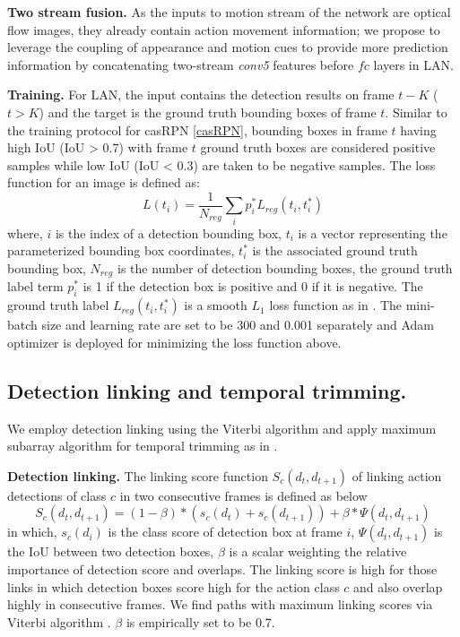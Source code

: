 \documentclass{bmvc2k}
\begin{document}
\textbf{Two stream fusion.}
As the inputs to motion stream of the network are optical flow images, they already contain action movement information; we propose to leverage the coupling of appearance and motion cues to provide more prediction information by concatenating two-stream \textit{conv5} features before $fc$ layers in LAN.

\textbf{Training.} For LAN, the input contains the detection results on frame $t-K$ ($t>K$) and the target is the ground truth bounding boxes of frame $t$. Similar to the training protocol for casRPN \ref{casRPN}, bounding boxes in frame $t$ having high IoU (IoU > 0.7) with frame $t$ ground truth boxes are considered positive samples while low IoU (IoU < 0.3) are taken to be negative samples. The loss function for an image is defined as: \begin{equation}
L(t_i) = \frac{1}{N_{reg}}\sum_ip_i^*L_{reg}(t_i, t_i^*) 
\end{equation}
where, $i$ is the index of a detection bounding box, $t_i$ is a vector representing the parameterized bounding box coordinates, $t_i^*$ is the associated ground truth bounding box, $N_{reg}$ is the number of detection bounding boxes, the ground truth label term $p_i^*$ is 1 if the detection box is positive and 0 if it is negative. The ground truth label $L_{reg}(t_i, t_i^*)$ is a smooth $L_1$ loss function as in \cite{schmidt2007fast}. The mini-batch size and learning rate are set to be 300 and 0.001 separately and Adam optimizer \cite{kingma2014adam} is deployed for minimizing the loss function above.

\subsection{Detection linking and temporal trimming.} 

We employ detection linking using the Viterbi algorithm \cite{forney1973viterbi} and apply maximum subarray algorithm for temporal trimming as in \cite{peng2016multi}.

\textbf{Detection linking.} The linking score function $S_c(d_t, d_{t+1})$ of linking action detections of class $c$ in two consecutive frames is defined as below
\begin{equation}
\label{equ:energy}
S_c(d_t, d_{t+1}) = {(1-\beta)*(s_c(d_t) + s_c(d_{t+1}))+\beta*\Psi(d_t,d_{t+1})}
\end{equation}
in which, $s_c(d_i)$ is the class score of detection box at frame $i$, $\Psi(d_t, d_{t+1})$ is the IoU between two detection boxes, $\beta$ is a scalar weighting the relative importance of detection score and overlaps. The linking score is high for those links in which detection boxes score high for the action class $c$ and also overlap highly in consecutive frames. We find paths with maximum linking scores via Viterbi algorithm \cite{forney1973viterbi}. $\beta$ is empirically set to be 0.7.
\end{document}
